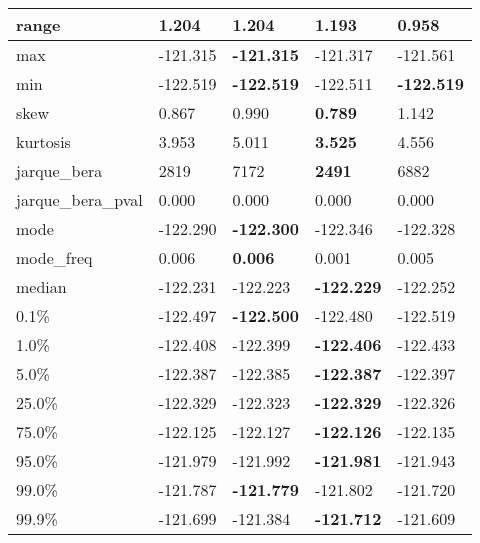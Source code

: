 \begin{table}[H]
\begin{tabular}{|l|m{10em}|m{10em}|m{10em}|m{10em}|}
\hline range & 1.204 & \bfseries 1.204 & 1.193 & \cellcolor[rgb]{0.9, 0.54, 0.52} 0.958 \\
\hline max & -121.315 & \bfseries -121.315 & -121.317 & \cellcolor[rgb]{0.9, 0.54, 0.52} -121.561 \\
\hline min & -122.519 & \bfseries -122.519 & \cellcolor[rgb]{0.9, 0.54, 0.52} -122.511 & \bfseries -122.519 \\
\hline skew & 0.867 & 0.990 & \bfseries 0.789 & \cellcolor[rgb]{0.9, 0.54, 0.52} 1.142 \\
\hline kurtosis & 3.953 & \cellcolor[rgb]{0.9, 0.54, 0.52} 5.011 & \bfseries 3.525 & 4.556 \\
\hline jarque\_bera & 2819 & \cellcolor[rgb]{0.9, 0.54, 0.52} 7172 & \bfseries 2491 & 6882 \\
\hline jarque\_bera\_pval & 0.000 & 0.000 & 0.000 & 0.000 \\
\hline mode & -122.290 & \bfseries -122.300 & \cellcolor[rgb]{0.9, 0.54, 0.52} -122.346 & -122.328 \\
\hline mode\_freq & 0.006 & \bfseries 0.006 & \cellcolor[rgb]{0.9, 0.54, 0.52} 0.001 & 0.005 \\
\hline median & -122.231 & -122.223 & \bfseries -122.229 & \cellcolor[rgb]{0.9, 0.54, 0.52} -122.252 \\
\hline 0.1\% & -122.497 & \bfseries -122.500 & -122.480 & \cellcolor[rgb]{0.9, 0.54, 0.52} -122.519 \\
\hline 1.0\% & -122.408 & -122.399 & \bfseries -122.406 & \cellcolor[rgb]{0.9, 0.54, 0.52} -122.433 \\
\hline 5.0\% & -122.387 & -122.385 & \bfseries -122.387 & \cellcolor[rgb]{0.9, 0.54, 0.52} -122.397 \\
\hline 25.0\% & -122.329 & \cellcolor[rgb]{0.9, 0.54, 0.52} -122.323 & \bfseries -122.329 & -122.326 \\
\hline 75.0\% & -122.125 & -122.127 & \bfseries -122.126 & \cellcolor[rgb]{0.9, 0.54, 0.52} -122.135 \\
\hline 95.0\% & -121.979 & -121.992 & \bfseries -121.981 & \cellcolor[rgb]{0.9, 0.54, 0.52} -121.943 \\
\hline 99.0\% & -121.787 & \bfseries -121.779 & -121.802 & \cellcolor[rgb]{0.9, 0.54, 0.52} -121.720 \\
\hline 99.9\% & -121.699 & \cellcolor[rgb]{0.9, 0.54, 0.52} -121.384 & \bfseries -121.712 & -121.609 \\
\hline
\end{tabular}
\end{table}
